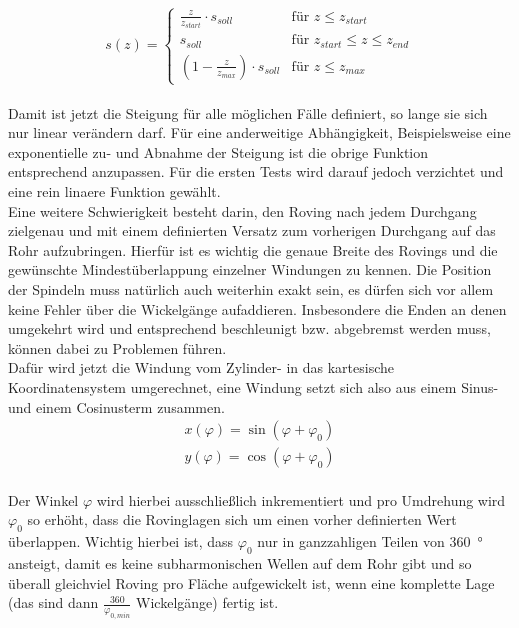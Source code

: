 \documentclass[12pt, a4paper, ngerman]{article}
\begin{document}
\begin{equation}\label{steigungHin}
	s(z)=
	\begin{cases}
		\frac{z}{z_{start}} \cdot s_{soll} & \text{für } z \leq z_{start}\\
		s_{soll} & \text{für } z_{start} \leq z \leq z_{end}\\
		\left( 1 - \frac{z}{z_{max}}\right) \cdot s_{soll} & \text{für } z \leq z_{max}
	\end{cases}	
\end{equation}\\
Damit ist jetzt die Steigung für alle möglichen Fälle definiert, so lange sie sich nur linear verändern darf. Für eine anderweitige Abhängigkeit, Beispielsweise eine exponentielle zu- und Abnahme der Steigung ist die obrige Funktion entsprechend anzupassen. Für die ersten Tests wird darauf jedoch verzichtet und eine rein linaere Funktion gewählt.\\
Eine weitere Schwierigkeit besteht darin, den Roving nach jedem Durchgang zielgenau und mit einem definierten Versatz zum vorherigen Durchgang auf das Rohr aufzubringen. Hierfür ist es wichtig die genaue Breite des Rovings und die gewünschte Mindestüberlappung einzelner Windungen zu kennen. Die Position der Spindeln muss natürlich auch weiterhin exakt sein, es dürfen sich vor allem keine Fehler über die Wickelgänge aufaddieren. Insbesondere die Enden an denen umgekehrt wird und entsprechend beschleunigt bzw. abgebremst werden muss, können dabei zu Problemen führen.\\
Dafür wird jetzt die Windung vom Zylinder- in das kartesische Koordinatensystem umgerechnet, eine Windung setzt sich also aus einem Sinus- und einem Cosinusterm zusammen.\\
\begin{eqnarray}\label{zylinder2kartesischHin}
	x(\varphi) = \sin(\varphi + \varphi_0)\\
	y(\varphi) = \cos(\varphi + \varphi_0)
\end{eqnarray}\\
Der Winkel $\varphi$ wird hierbei ausschließlich inkrementiert und pro Umdrehung wird $\varphi_0$ so erhöht, dass die Rovinglagen sich um einen vorher definierten Wert überlappen. Wichtig hierbei ist, dass $\varphi_0$ nur in ganzzahligen Teilen von \SI{360}{\degree} ansteigt, damit es keine subharmonischen Wellen auf dem Rohr gibt und so überall gleichviel Roving pro Fläche aufgewickelt ist, wenn eine komplette Lage (das sind dann $\frac{360}{\varphi_{0,min}}$ Wickelgänge) fertig ist.\\
\end{document}

